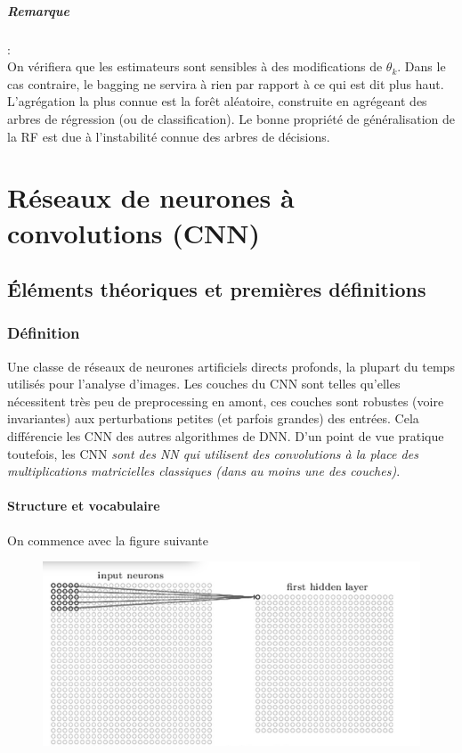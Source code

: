 \documentclass[a4paper,12pt]{report}
\newcommand\bk{\color{black}}
\newcommand\brick{\color{brick}}
\newcommand\navy{\color{navy}}
\numberwithin{equation}{section} %
\begin{document}
\paragraph*{Remarque }:\\
On vérifiera que les estimateurs sont sensibles à des modifications de $\theta_k$. Dans le cas contraire, le bagging ne servira à rien par rapport à ce qui est dit plus haut. \\
 L'agrégation la plus connue est la forêt aléatoire, construite en agrégeant des arbres de régression (ou de classification). Le bonne propriété de généralisation de la RF est due à l'instabilité connue des arbres de décisions.

\newpage

\navy \chapter{Réseaux de neurones à convolutions (CNN)} \bk
\section{Éléments théoriques et premières définitions}
\brick \subsection{Définition} \bk
Une classe de réseaux de neurones artificiels directs profonds, la plupart du temps utilisés pour l'analyse d'images. Les couches du CNN sont telles qu'elles nécessitent très peu de preprocessing en amont, ces couches sont robustes (voire invariantes) aux perturbations petites (et parfois grandes) des entrées. Cela différencie les CNN des autres algorithmes de DNN. 
D'un point de vue pratique toutefois, les CNN \textit{sont des NN qui utilisent des convolutions à la place des multiplications matricielles classiques (dans au moins une des couches)}.

\navy \subsubsection{Structure et vocabulaire} \bk
On commence avec la figure suivante

\begin{figure}[!ht]
\centering
\includegraphics[scale=0.6]{conv_5x5.png}
\end{figure}
\end{document}
